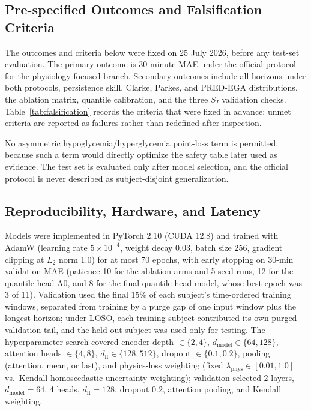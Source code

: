 \documentclass[journal]{IEEEtran}
\begin{document}
\subsection{Pre-specified Outcomes and Falsification Criteria}

The outcomes and criteria below were fixed on 25 July 2026, before any test-set evaluation. The primary outcome is 30-minute MAE under the official protocol for the physiology-focused branch. Secondary outcomes include all horizons under both protocols, persistence skill, Clarke, Parkes, and PRED-EGA distributions, the ablation matrix, quantile calibration, and the three $S_I$ validation checks. Table~\ref{tab:falsification} records the criteria that were fixed in advance; unmet criteria are reported as failures rather than redefined after inspection.

No asymmetric hypoglycemia/hyperglycemia point-loss term is permitted, because such a term would directly optimize the safety table later used as evidence. The test set is evaluated only after model selection, and the official protocol is never described as subject-disjoint generalization.

\subsection{Reproducibility, Hardware, and Latency}

Models were implemented in PyTorch 2.10 (CUDA 12.8) and trained with AdamW (learning rate $5 \times 10^{-4}$, weight decay 0.03, batch size 256, gradient clipping at $L_2$ norm 1.0) for at most 70 epochs, with early stopping on 30-min validation MAE (patience 10 for the ablation arms and 5-seed runs, 12 for the quantile-head A0, and 8 for the final quantile-head model, whose best epoch was 3 of 11). Validation used the final 15\% of each subject's time-ordered training windows, separated from training by a purge gap of one input window plus the longest horizon; under LOSO, each training subject contributed its own purged validation tail, and the held-out subject was used only for testing. The hyperparameter search covered encoder depth $\in \{2, 4\}$, $d_{\text{model}} \in \{64, 128\}$, attention heads $\in \{4, 8\}$, $d_{\text{ff}} \in \{128, 512\}$, dropout $\in \{0.1, 0.2\}$, pooling (attention, mean, or last), and physics-loss weighting (fixed $\lambda_{\text{phys}} \in [0.01, 1.0]$ vs.\ Kendall homoscedastic uncertainty weighting); validation selected 2 layers, $d_{\text{model}} = 64$, 4 heads, $d_{\text{ff}} = 128$, dropout 0.2, attention pooling, and Kendall weighting.
\end{document}
